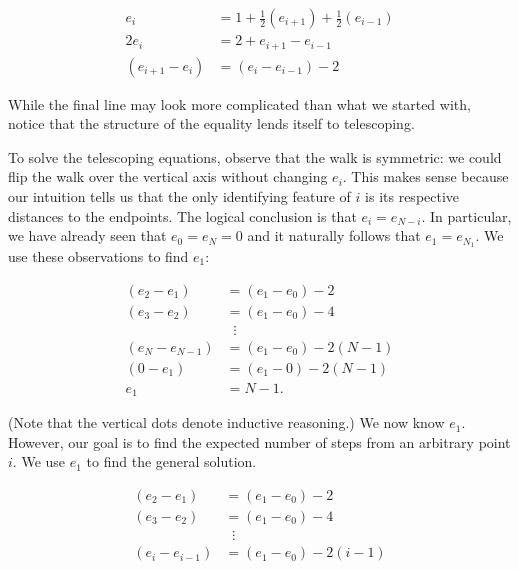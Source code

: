 \documentclass[12pt]{article}
\theoremstyle{definition}
\begin{document}
\begin{align}
e_i &= 1 + \frac{1}{2} \left(e_{i+1}\right) + \frac{1}{2}\left(e_{i-1}\right) \nonumber \\
2 e_i &= 2 + e_{i+1} - e_{i-1} \nonumber \\
\left(e_{i+1} - e_i\right) &=\left( e_i - e_{i-1}\right) - 2 \nonumber
\end{align}

While the final line may look more complicated than what we started with,
notice that the structure of the equality lends itself to telescoping.

To solve the telescoping equations, observe that the walk is symmetric:
we could flip the walk over the vertical axis without changing $e_i$.
This makes sense because our intuition tells us that the only 
identifying feature of $i$ is its respective distances to the endpoints.
The logical conclusion is that $e_i=e_{N-i}$.
In particular, we have already seen that $e_0=e_N=0$ and it
naturally follows that $e_1=e_{N_1}$.
We use these observations to find $e_1$:

\begin{align}
(e_2 - e_1) &= (e_1-e_0) -2 \nonumber\\
(e_3 - e_2) &= (e_1-e_0) -4 \nonumber\\
&\;\;\vdots \nonumber\\
\left(e_N - e_{N-1}\right) &= \left(e_1 - e_0\right) - 2 (N-1) \nonumber \\
\left(0 - e_1\right) &= \left(e_1 - 0\right) - 2 (N-1) \nonumber \\
e_1 &= N-1. \nonumber
\end{align}

(Note that the vertical dots denote inductive reasoning.)
We now know $e_1$.
However, our goal is to find the expected number of steps
from an arbitrary point $i$.
We use $e_1$ to find the general solution.

\begin{align}
(e_2 - e_1) &= (e_1-e_0) -2 \nonumber\\
(e_3 - e_2) &= (e_1-e_0) -4 \nonumber\\
&\;\;\vdots \nonumber\\
(e_i-e_{i-1}) &= (e_1 - e_0) - 2(i-1) \nonumber
\end{align}
\end{document}
